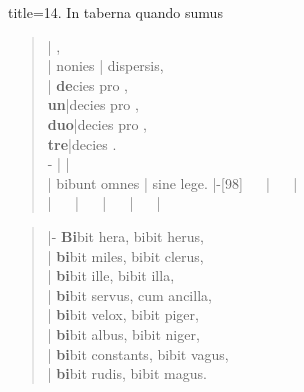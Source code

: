 \begin{song}{title={14. In taberna quando sumus}}
\begin{verse}
  \resetmusic
   \chord{$\downarrow$}   |  ,\\
  \startline | nonies  | dispersis,\\
  \startline | \textbf{de}cies pro ,\\
  \startline \textbf{un}|decies pro ,\\
  \startline \textbf{duo}|decies pro ,\\
  \startline \textbf{tre}|decies   .\\
  \chord-{} |    |   \\
  \startline | bibunt omnes | sine lege. |\chord-{[98]} ~\wholerest ~ | ~\wholerest ~ |\\
  \startline | ~\wholerest ~ | ~\wholerest ~ | ~\wholerest ~ | ~\wholerest ~ |
\end{verse}

\newpage

\begin{verse}
  |\chord-{} \textbf{Bi}bit hera, bibit herus,\\
  \startline| \textbf{bi}bit miles, bibit clerus,\\
  \startline| \textbf{bi}bit ille, bibit illa,\\
  \startline| \textbf{bi}bit servus, cum ancilla,\\
  \startline| \textbf{bi}bit velox, bibit piger,\\
  \startline| \textbf{bi}bit albus, bibit niger,\\
  \startline| \textbf{bi}bit constants, bibit vagus,\\
  \startline| \textbf{bi}bit rudis, bibit magus.\\
\end{verse}


\end{song}
